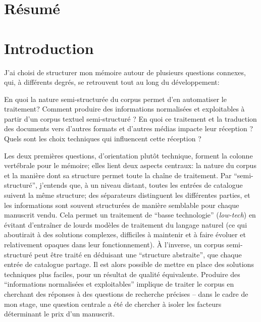 
\frontmatter
\chapter*{Résumé}


\mainmatter
\chapter*{Introduction}
J'ai choisi de structurer mon mémoire autour de plusieurs questions connexes, qui, à différents degrés, se retrouvent tout au long du développement:

En quoi la nature semi-structurée du corpus permet d'en automatiser le traitement? Comment produire des informations normalisées et exploitables à partir d'un corpus textuel semi-structuré ? En quoi ce traitement et la traduction des documents vers d'autres formats et d'autres médias impacte leur réception ? Quels sont les choix techniques qui influencent cette réception ?

Les deux premières questions, d'orientation plutôt technique, forment la colonne vertébrale pour le mémoire; elles lient deux aspects centraux: la nature du corpus et la manière dont sa structure permet toute la chaîne de traitement. Par \enquote{semi-structuré}, j'entends que, à un niveau distant, toutes les entrées de catalogue suivent la même structure; des séparateurs distinguent les différentes parties, et les informations sont souvent structurées de manière semblable pour chaque manuscrit vendu. Cela permet un traitement de \enquote{basse technologie} (\emph{low-tech}) en évitant d'entraîner de lourds modèles de traitement du langage naturel (ce qui aboutirait à des solutions complexes, difficiles à maintenir et à faire évoluer et relativement opaques dans leur fonctionnement). À l'inverse, un corpus semi-structuré peut être traité en déduisant une \enquote{structure abstraite}, que chaque entrée de catalogue partage. Il est alors possible de mettre en place des solutions techniques plus faciles, pour un résultat de qualité équivalente. Produire des \enquote{informations normalisées et exploitables} implique de traiter le corpus en cherchant des réponses à des questions de recherche précises -- dans le cadre de mon stage, une question centrale a été de chercher à isoler les facteurs déterminant le prix d'un manuscrit.

